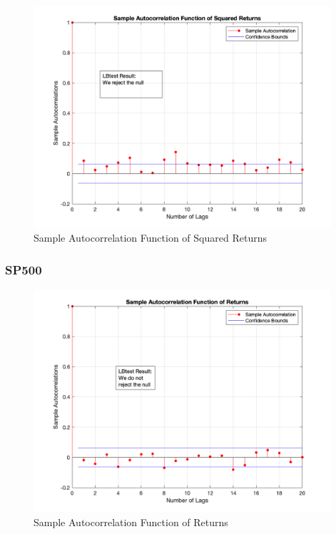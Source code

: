 \documentclass{report}
\begin{document}
\begin{figure}[H]
	\centering
	\includegraphics[width = 11cm]{fig/1c12}
	\caption{Sample Autocorrelation Function of Squared Returns} 
\end{figure}





\subsubsection*{SP500}

\begin{figure}[H]
	\centering
	\includegraphics[width = 11cm]{fig/1c21}
	\caption{Sample Autocorrelation Function of Returns} 
\end{figure}
\end{document}

